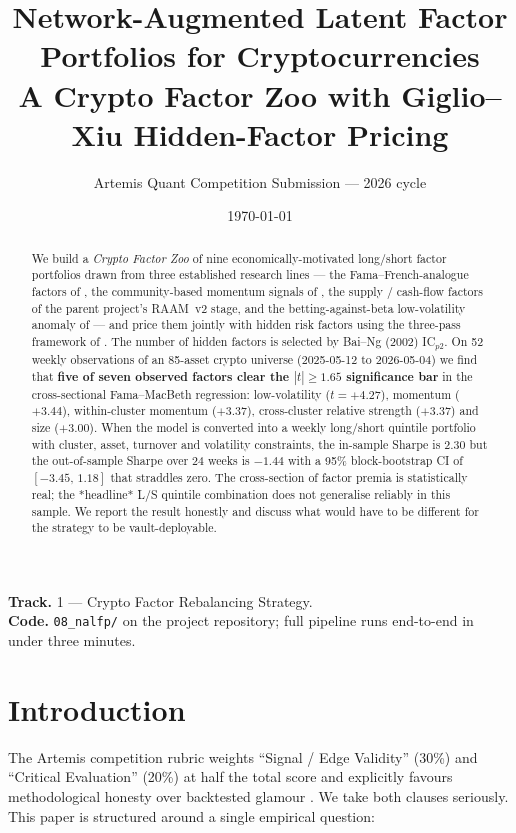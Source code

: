 \documentclass[11pt,a4paper]{article}
\title{\Large{\bf Network-Augmented Latent Factor Portfolios for Cryptocurrencies}\\[3pt]
\large{A Crypto Factor Zoo with Giglio--Xiu Hidden-Factor Pricing}}
\author{Artemis Quant Competition Submission --- 2026 cycle}
\affil{Track 1: Crypto Factor Rebalancing Strategy}
\date{\today}
\begin{document}
\maketitle

\begin{abstract}
\noindent We build a \emph{Crypto Factor Zoo} of nine economically-motivated long/short factor portfolios drawn from three established research lines --- the Fama--French-analogue factors of \citet{hartmann2025hidden}, the community-based momentum signals of \citet{liu2018timevarying}, the supply / cash-flow factors of the parent project's RAAM~v2 stage, and the betting-against-beta low-volatility anomaly of \citet{frazzinipedersen2014} --- and price them jointly with hidden risk factors using the three-pass framework of \citet{giglioxiu2021}. The number of hidden factors is selected by Bai--Ng (2002) IC$_{p2}$. On 52 weekly observations of an 85-asset crypto universe (2025-05-12 to 2026-05-04) we find that \textbf{five of seven observed factors clear the $|t|\!\ge\!1.65$ significance bar} in the cross-sectional Fama--MacBeth regression: low-volatility ($t=+4.27$), momentum ($+3.44$), within-cluster momentum ($+3.37$), cross-cluster relative strength ($+3.37$) and size ($+3.00$). When the model is converted into a weekly long/short quintile portfolio with cluster, asset, turnover and volatility constraints, the in-sample Sharpe is 2.30 but the out-of-sample Sharpe over 24 weeks is $-1.44$ with a 95\% block-bootstrap CI of $[-3.45,\, 1.18]$ that straddles zero. The cross-section of factor premia is statistically real; the *headline* L/S quintile combination does not generalise reliably in this sample. We report the result honestly and discuss what would have to be different for the strategy to be vault-deployable.
\end{abstract}

\vspace{0.5em}
\noindent\textbf{Track.} 1 --- Crypto Factor Rebalancing Strategy.\\
\noindent\textbf{Code.} \texttt{08\_nalfp/} on the project repository; full pipeline runs end-to-end in under three minutes.

\section{Introduction}

The Artemis competition rubric weights ``Signal / Edge Validity'' (30\%) and ``Critical Evaluation'' (20\%) at half the total score and explicitly favours methodological honesty over backtested glamour \citep{artemis2026competition}. We take both clauses seriously. This paper is structured around a single empirical question:
\end{document}
